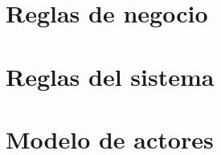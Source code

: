 \documentclass[10pt]{book}
\begin{document}
	\chapter{Reglas de negocio}
%	
	
	\chapter{Reglas del sistema}
%	
	
	\chapter{Modelo de actores}
%	
	
	
%
%	
	
\end{document}
